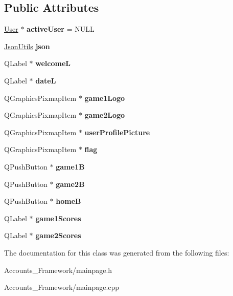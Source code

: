 \subsection*{Public Attributes}
\begin{DoxyCompactItemize}
\item 
\mbox{\label{classmainPage_a09746ec017c3674d4cf6070d67878c5c}} 
\hyperlink{classUser}{User} $\ast$ {\bfseries active\+User} = N\+U\+LL
\item 
\mbox{\label{classmainPage_ad8aa4ec26116fc65f0c1fbdfc8f1c46a}} 
\hyperlink{classJsonUtils}{Json\+Utils} {\bfseries json}
\item 
\mbox{\label{classmainPage_afba58f3009e3572b8538ec9b5091d3e2}} 
Q\+Label $\ast$ {\bfseries welcomeL}
\item 
\mbox{\label{classmainPage_af4c776e295e005ce92db4ab2ad43b351}} 
Q\+Label $\ast$ {\bfseries dateL}
\item 
\mbox{\label{classmainPage_a8ded2dbb886faf41e7868c4e31d025e7}} 
Q\+Graphics\+Pixmap\+Item $\ast$ {\bfseries game1\+Logo}
\item 
\mbox{\label{classmainPage_a99262834603fa2a5286a4cc8eca69825}} 
Q\+Graphics\+Pixmap\+Item $\ast$ {\bfseries game2\+Logo}
\item 
\mbox{\label{classmainPage_a81b4792c666b46bc47ae64d18292d80e}} 
Q\+Graphics\+Pixmap\+Item $\ast$ {\bfseries user\+Profile\+Picture}
\item 
\mbox{\label{classmainPage_ae2ae1e7d6cc2f465d539d9e7e73314f2}} 
Q\+Graphics\+Pixmap\+Item $\ast$ {\bfseries flag}
\item 
\mbox{\label{classmainPage_a29b403e262009f83281f752eb6a91e62}} 
Q\+Push\+Button $\ast$ {\bfseries game1B}
\item 
\mbox{\label{classmainPage_a83a8da3a7de1fcef49732ce7cef07757}} 
Q\+Push\+Button $\ast$ {\bfseries game2B}
\item 
\mbox{\label{classmainPage_a6b60c5103a4ffa5c3de03d8cfe22b5b5}} 
Q\+Push\+Button $\ast$ {\bfseries homeB}
\item 
\mbox{\label{classmainPage_a4ea215b0dd97ccaaeeecbb3e796fb7e1}} 
Q\+Label $\ast$ {\bfseries game1\+Scores}
\item 
\mbox{\label{classmainPage_a9469c2ef1da114595a159acb78008316}} 
Q\+Label $\ast$ {\bfseries game2\+Scores}
\end{DoxyCompactItemize}


The documentation for this class was generated from the following files\+:\begin{DoxyCompactItemize}
\item 
Accounts\+\_\+\+Framework/mainpage.\+h\item 
Accounts\+\_\+\+Framework/mainpage.\+cpp\end{DoxyCompactItemize}
